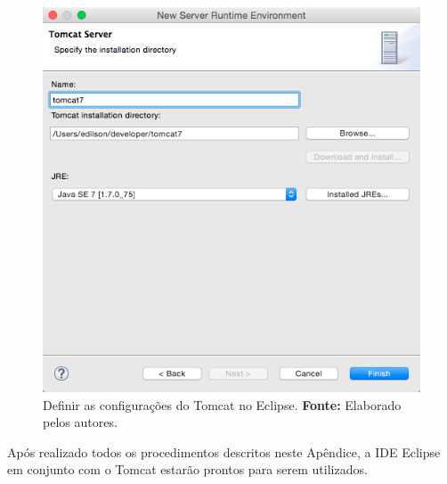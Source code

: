 \newpage
\captionsetup[figure]{list=no}
\begin{figure}[h!]
	\centerline{\includegraphics[scale=0.4]{./imagens/apendices/definir-pasta-home-tomcat.png}}
	\caption[Definir as configurações do Tomcat no Eclipse.]
	{Definir as configurações do Tomcat no Eclipse. \textbf{Fonte:} Elaborado pelos autores.}
	\label{fig:ap2:definir_diretorio_tomcat_no_eclipse}
\end{figure}

Após realizado todos os procedimentos descritos neste Apêndice, a IDE Eclipse em conjunto com o Tomcat estarão prontos para serem utilizados.
